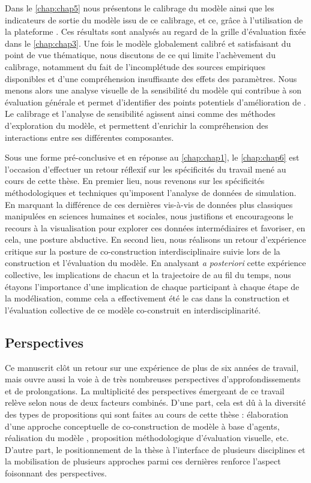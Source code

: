 Dans le \cref{chap:chap5} nous présentons le calibrage du modèle \simfeodal{} ainsi que les indicateurs de sortie du modèle issu de ce calibrage, et ce, grâce à l'utilisation de la plateforme \simedb{}.
Ces résultats sont analysés au regard de la grille d'évaluation fixée dans le \cref{chap:chap3}.
Une fois le modèle globalement calibré et satisfaisant du point de vue thématique, nous discutons de ce qui limite l'achèvement du calibrage, notamment du fait de l'incomplétude des sources empiriques disponibles et d'une compréhension insuffisante des effets des paramètres.
Nous menons alors une analyse visuelle de la sensibilité du modèle qui contribue à son évaluation générale et permet d'identifier des points potentiels d'amélioration de \simfeodal{}.
Le calibrage et l'analyse de sensibilité agissent ainsi comme des méthodes d'exploration du modèle, et permettent d'enrichir la compréhension des interactions entre ses différentes composantes.

Sous une forme \og pré-conclusive\fg{} et en réponse au \cref{chap:chap1}, le \cref{chap:chap6} est l'occasion d'effectuer un retour réflexif sur les spécificités du travail mené au cours de cette thèse.
En premier lieu, nous revenons sur les spécificités méthodologiques et techniques qu'imposent l'analyse de données de simulation.
En marquant la différence de ces dernières vis-à-vis de données plus classiques manipulées en sciences humaines et sociales, nous justifions et encourageons le recours à la visualisation pour explorer ces \og données intermédiaires\fg{} et favoriser, en cela, une posture abductive.
En second lieu, nous réalisons un retour d'expérience critique sur la posture de co-construction interdisciplinaire suivie lors de la construction et l'évaluation du modèle.
En analysant \textit{a posteriori} cette expérience collective, les implications de chacun et la trajectoire de \simfeodal{} au fil du temps, nous étayons l'importance d'une implication de chaque participant à chaque étape de la modélisation, comme cela a effectivement été le cas dans la construction et l'évaluation collective de ce modèle co-construit en interdisciplinarité.


\subsection*{Perspectives}

Ce manuscrit clôt un retour sur une expérience de plus de six années de travail, mais ouvre aussi la voie à de très nombreuses perspectives d'approfondissements et de prolongations.
La multiplicité des perspectives émergeant de ce travail relève selon nous de deux facteurs combinés.
D'une part, cela est dû à la diversité des types de propositions qui sont faites au cours de cette thèse :
	élaboration d'une approche conceptuelle de co-construction de modèle à base d'agents, réalisation du modèle \simfeodal{}, proposition méthodologique d'évaluation visuelle, etc.
D'autre part, le positionnement de la thèse à l'interface de plusieurs disciplines et la mobilisation de plusieurs approches parmi ces dernières renforce l'aspect foisonnant des perspectives. 

